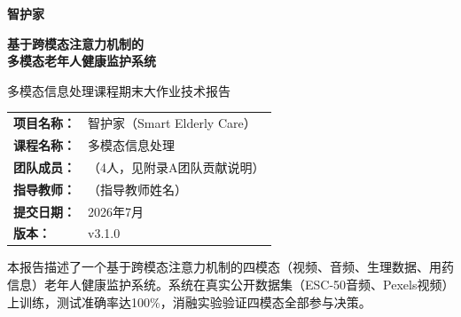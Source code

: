 \begin{titlepage}
    \vspace*{1cm}
    {\heiti\bfseries 智护家\par}
    \vspace{0.5cm}
    {\heiti\bfseries 基于跨模态注意力机制的\\多模态老年人健康监护系统\par}
    \vspace{2cm}
    {\kaishu 多模态信息处理课程期末大作业技术报告\par}
    \vspace{4cm}
    {
    \begin{tabular}{ll}
        \textbf{项目名称：} & 智护家（Smart Elderly Care） \\
        \textbf{课程名称：} & 多模态信息处理 \\
        \textbf{团队成员：} & （4人，见附录A团队贡献说明） \\
        \textbf{指导教师：} & （指导教师姓名） \\
        \textbf{提交日期：} & 2026年7月 \\
        \textbf{版本：} & v3.1.0
    \end{tabular}\par}
    \vspace{3cm}
    {\songti 本报告描述了一个基于跨模态注意力机制的四模态（视频、音频、生理数据、用药信息）老年人健康监护系统。系统在真实公开数据集（ESC-50音频、Pexels视频）上训练，测试准确率达100\%，消融实验验证四模态全部参与决策。\par}
\end{titlepage}
\thispagestyle{empty}
\newpage
\thispagestyle{empty}
\ \thispagestyle{empty}
